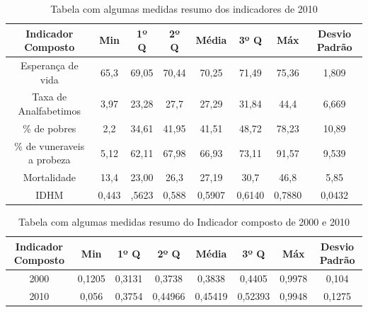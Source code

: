 \documentclass[11pt,a4paper]{article}
\begin{document}
\begin{table}[h!]
  \begin{center}
      \caption{Tabela com algumas medidas resumo dos indicadores de 2010}
    \begin{tabular}{c|c|c|c|c|c|c|c}
    \hline
      \textbf{Indicador Composto} & \textbf{Min} & \textbf{1º Q} & \textbf{2º Q} & \textbf{Média} & \textbf{3º Q} & \textbf{Máx}  & \textbf{Desvio Padrão} \\
      \hline
      Esperança de vida & 65,3 & 69,05 & 70,44 & 70,25 & 71,49 & 75,36 & 1,809 \\
      Taxa de Analfabetimos & 3,97 & 23,28 & 27,7 & 27,29 & 31,84 & 44,4 & 6,669\\
      \% de pobres & 2,2 & 34,61 & 41,95 & 41,51 & 48,72 & 78,23 & 10,89  \\ 
      \% de vuneraveis a probeza & 5,12 & 62,11 & 67,98 & 66,93 & 73,11 & 91,57 & 9,539 \\ 
      Mortalidade & 13,4 & 23,00 & 26,3 & 27,19 & 30,7 & 46,8 & 5,85\\ 
      IDHM & 0,443 & ,5623 & 0,588 & 0,5907 & 0,6140 & 0,7880 & 0,0432\\ 
      \hline
    \end{tabular}
     \label{table:2}
  \end{center}
\end{table}

\begin{table}[h!]
  \begin{center}
      \caption{Tabela com algumas medidas resumo do Indicador composto de 2000 e 2010}
    \begin{tabular}{c|c|c|c|c|c|c|c}
    \hline
      \textbf{Indicador Composto} & \textbf{Min} & \textbf{1º Q} & \textbf{2º Q} & \textbf{Média} & \textbf{3º Q} & \textbf{Máx}  & \textbf{Desvio Padrão} \\
      \hline
	  2000 & 0,1205 & 0,3131 & 0,3738 & 0,3838 & 0,4405 & 0,9978 & 0,104\\
	  2010 & 0,056 & 0,3754 & 0,44966 & 0,45419 & 0,52393 & 0,9948 & 0,1275\\
      \hline
    \end{tabular}
     \label{table:3}
  \end{center}
\end{table}
\end{document}
